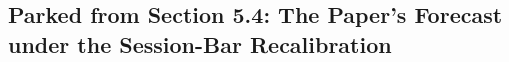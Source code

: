 \subsection{Parked from Section 5.4: The Paper's Forecast under the Session-Bar Recalibration}
\label{sec:app_run_parked}

